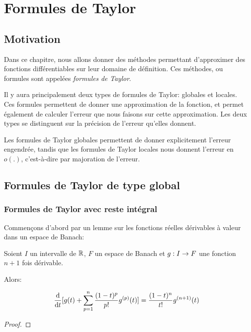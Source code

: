 \chapter{Formules de Taylor}

\section*{Motivation}

Dans ce chapitre, nous allons donner des méthodes permettant d'approximer des
fonctions différentiables sur leur domaine de définition. Ces méthodes, ou
formules sont appelées \textit{formules de Taylor}.

Il y aura principalement deux types de formules de Taylor: globales et locales.
Ces formules permettent de donner une approximation de la fonction, et permet
également de calculer l'erreur que nous faisons sur cette approximation. Les
deux types se distinguent sur la précision de l'erreur qu'elles donnent.

Les formules de Taylor globales permettent de donner explicitement l'erreur
engendrée, tandis que les formules de Taylor locales nous donnent l'erreur en
$o(.)$, c'est-à-dire par majoration de l'erreur.

\section{Formules de Taylor de type global}

\subsection{Formules de Taylor avec reste intégral}

Commençons d'abord par un lemme sur les fonctions réelles dérivables à valeur
dans un espace de Banach:

\begin{lemma}
	\label{lemma:taylor_formula_reste_derivative}
	Soient $I$ un intervalle de $\mathbb{R}$, $F$ un espace de Banach et
	$g : I \rightarrow F$ une fonction $n+1$ fois dérivable.

	Alors:

	\begin{equation*}
		\displaystyle \dv{t} [g(t) + \sum_{p = 1}^{n} \frac{(1 - t)^{p}}{p!}
		g^{(p)}(t)] = \frac{(1 - t)^{n}}{t!} g^{(n+1)}(t)
	\end{equation*}
\end{lemma}

\ifdefined\outputproof
\begin{proof}

\end{proof}
\fi

